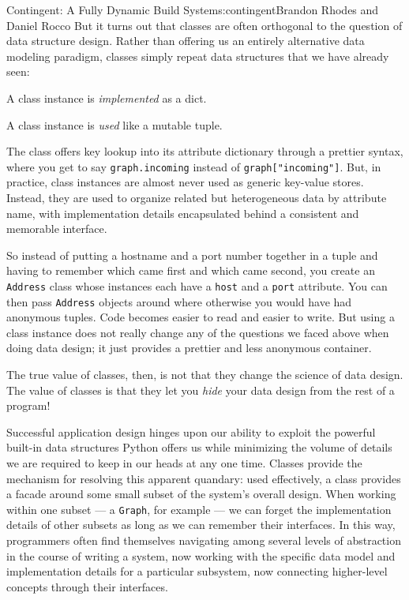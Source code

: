 \begin{aosachapter}{Contingent: A Fully Dynamic Build System}{s:contingent}{Brandon Rhodes and Daniel Rocco}
But it turns out that classes are often orthogonal to the question of
data structure design. Rather than offering us an entirely alternative
data modeling paradigm, classes simply repeat data structures that we
have already seen:

\begin{aosaitemize}

\item
  A class instance is \emph{implemented} as a dict.
\item
  A class instance is \emph{used} like a mutable tuple.
\end{aosaitemize}

The class offers key lookup into its attribute dictionary through a
prettier syntax, where you get to say \texttt{graph.incoming} instead of
\texttt{graph{[}"incoming"{]}}. But, in practice, class instances are
almost never used as generic key-value stores. Instead, they are used to
organize related but heterogeneous data by attribute name, with
implementation details encapsulated behind a consistent and memorable
interface.

So instead of putting a hostname and a port number together in a tuple
and having to remember which came first and which came second, you
create an \texttt{Address} class whose instances each have a
\texttt{host} and a \texttt{port} attribute. You can then pass
\texttt{Address} objects around where otherwise you would have had
anonymous tuples. Code becomes easier to read and easier to write. But
using a class instance does not really change any of the questions we
faced above when doing data design; it just provides a prettier and less
anonymous container.

The true value of classes, then, is not that they change the science of
data design. The value of classes is that they let you \emph{hide} your
data design from the rest of a program!

Successful application design hinges upon our ability to exploit the
powerful built-in data structures Python offers us while minimizing the
volume of details we are required to keep in our heads at any one time.
Classes provide the mechanism for resolving this apparent quandary: used
effectively, a class provides a facade around some small subset of the
system's overall design. When working within one subset --- a
\texttt{Graph}, for example --- we can forget the implementation details
of other subsets as long as we can remember their interfaces. In this
way, programmers often find themselves navigating among several levels
of abstraction in the course of writing a system, now working with the
specific data model and implementation details for a particular
subsystem, now connecting higher-level concepts through their
interfaces.


\end{aosachapter}
